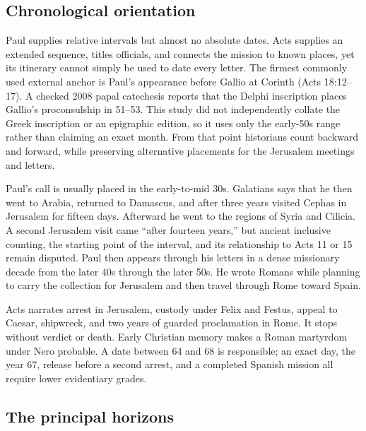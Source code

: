 \subsection{Chronological orientation}\label{sec:paul-orientation}

Paul supplies relative intervals but almost no absolute dates. Acts supplies
an extended sequence, titles officials, and connects the mission to known
places, yet its itinerary cannot simply be used to date every letter. The
firmest commonly used external anchor is Paul's appearance before Gallio at
Corinth (Acts 18:12--17). A checked 2008 papal catechesis reports that the
Delphi inscription places Gallio's proconsulship in 51--53. This study did not
independently collate the Greek inscription or an epigraphic edition, so it
uses only the early-50s range rather than claiming an exact month. From that
point historians count backward and forward, while preserving alternative
placements for the Jerusalem meetings and letters.

Paul's call is usually placed in the early-to-mid 30s. Galatians says that he
then went to Arabia, returned to Damascus, and after three years visited
Cephas in Jerusalem for fifteen days. Afterward he went to the regions of
Syria and Cilicia. A second Jerusalem visit came ``after fourteen years,'' but
ancient inclusive counting, the starting point of the interval, and its
relationship to Acts 11 or 15 remain disputed. Paul then appears through his
letters in a dense missionary decade from the later 40s through the later
50s. He wrote Romans while planning to carry the collection for Jerusalem and
then travel through Rome toward Spain.

Acts narrates arrest in Jerusalem, custody under Felix and Festus, appeal to
Caesar, shipwreck, and two years of guarded proclamation in Rome. It stops
without verdict or death. Early Christian memory makes a Roman martyrdom
under Nero probable. A date between 64 and 68 is responsible; an exact day,
the year 67, release before a second arrest, and a completed Spanish mission
all require lower evidentiary grades.

\subsection{The principal horizons}

